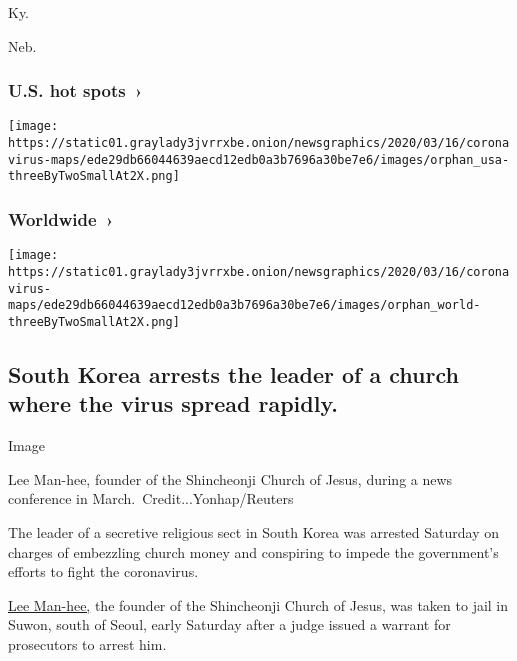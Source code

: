 Ky.

\href{https://www.nytimes3xbfgragh.onion/interactive/2020/us/nebraska-coronavirus-cases.html}{}

Neb.

\href{https://www.nytimes3xbfgragh.onion/interactive/2020/us/coronavirus-us-cases.html}{}

\hypertarget{us-hot-spots-}{%
\subsubsection{U.S. hot spots~›}\label{us-hot-spots-}}

\texttt{[image: https://static01.graylady3jvrrxbe.onion/newsgraphics/2020/03/16/coronavirus-maps/ede29db66044639aecd12edb0a3b7696a30be7e6/images/orphan\_usa-threeByTwoSmallAt2X.png]}

\href{https://www.nytimes3xbfgragh.onion/interactive/2020/world/coronavirus-maps.html}{}

\hypertarget{worldwide-}{%
\subsubsection{Worldwide~›}\label{worldwide-}}

\texttt{[image: https://static01.graylady3jvrrxbe.onion/newsgraphics/2020/03/16/coronavirus-maps/ede29db66044639aecd12edb0a3b7696a30be7e6/images/orphan\_world-threeByTwoSmallAt2X.png]}

\hypertarget{south-korea-arrests-the-leader-of-a-church-where-the-virus-spread-rapidly}{%
\subsection{South Korea arrests the leader of a church where the virus
spread
rapidly.}\label{south-korea-arrests-the-leader-of-a-church-where-the-virus-spread-rapidly}}

Image

Lee Man-hee, founder of the Shincheonji Church of Jesus, during a news
conference in March.~Credit...Yonhap/Reuters

The leader of a secretive religious sect in South Korea was arrested
Saturday on charges of embezzling church money and conspiring to impede
the government's efforts to fight the coronavirus.

\href{https://www.nytimes3xbfgragh.onion/2020/03/02/world/asia/coronavirus-south-korea-shincheonji.html?searchResultPosition=1}{Lee
Man-hee,} the founder of the Shincheonji Church of Jesus, was taken to
jail in Suwon, south of Seoul, early Saturday after a judge issued a
warrant for prosecutors to arrest him.

